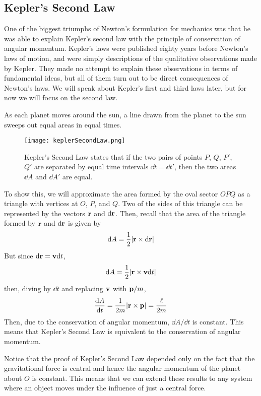 \subsection*{Kepler's Second Law}
One of the biggest triumphs of Newton's formulation for mechanics was that he was able to explain Kepler's second law with the principle of conservation of angular momentum. Kepler's laws were published eighty years before Newton's laws of motion, and were simply descriptions of the qualitative observations made by Kepler. They made no attempt to explain these observations in terms of fundamental ideas, but all of them turn out to be direct consequences of Newton's laws. We will speak about Kepler's first and third laws later, but for now we will focus on the second law.
\begin{theorem}
    As each planet moves around the sun, a line drawn from the planet to the sun sweeps out equal areas in equal times. 
\end{theorem}
\begin{figure}[h!]
    \centering
    \texttt{[image: keplerSecondLaw.png]}
    \caption{Kepler's Second Law states that if the two pairs of points $P$, $Q$, $P'$, $Q'$ are separated by equal time intervals $\dd t = \dd t'$, then the two areas $\dd A$ and $\dd A'$ are equal.}
    \label{fig:keplerSecondLaw}
\end{figure}

To show this, we will approximate the area formed by the oval sector $OPQ$ as a triangle with vertices at $O$, $P$, and $Q$. Two of the sides of this triangle can be represented by the vectors $\mathbf{r}$ and $\mathbf{\dd} \mathbf{r}$. Then, recall that the area of the triangle formed by $\mathbf{r}$ and $\dd \mathbf{r}$ is given by
\[ \dd A = \frac{1}{2}\abs{\mathbf{r} \times \dd \mathbf{r}} \]
But since $\dd \mathbf{r} = \mathbf{v} \dd t$, 
\[ \dd A = \frac{1}{2}\abs{\mathbf{r} \times \mathbf{v} \dd t} \]
then, diving by $\dd t$ and replacing $\mathbf{v}$ with $\mathbf{p}/m$,
\[ \frac{\dd A}{\dd t} = \frac{1}{2m}\abs{\mathbf{r} \times \mathbf{p}} = \frac{\ell}{2m} \]
Then, due to the conservation of angular momentum, $\dd A/\dd t$ is constant. This means that Kepler's Second Law is equivalent to the conservation of angular momentum. 

Notice that the proof of Kepler's Second Law depended only on the fact that the gravitational force is central and hence the angular momentum of the planet about $O$ is constant. This means that we can extend these results to any system where an object moves under the influence of just a central force. 

